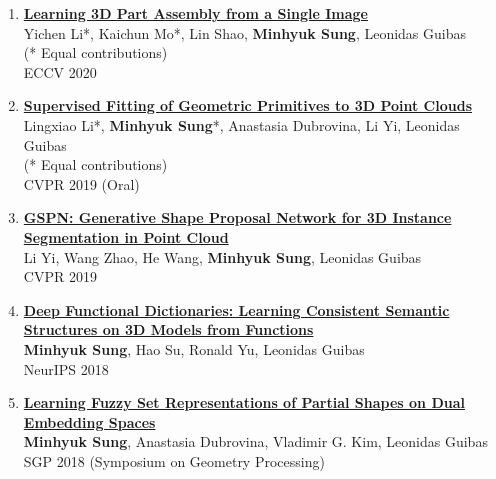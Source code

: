 \documentclass[letterpaper,10pt]{article} %
\newcommand{\blankline}{\quad\pagebreak[2]}
\begin{document}
{\begin{enumerate}
\item \label{eccv20_1}
\href{https://cs.stanford.edu/~kaichun/impartass/}{\textbf{Learning 3D Part Assembly from a Single Image}}\\
Yichen Li*, Kaichun Mo*, Lin Shao, \textbf{Minhyuk Sung}, Leonidas Guibas\\
(* Equal contributions)\\
ECCV 2020\\
\blankline

\item \label{cvpr19_2}
\href{https://arxiv.org/abs/1811.08988}{\textbf{Supervised Fitting of Geometric Primitives to 3D Point Clouds}}\\
Lingxiao Li*, \textbf{Minhyuk Sung}*, Anastasia Dubrovina, Li Yi, Leonidas Guibas\\
(* Equal contributions)\\
CVPR 2019 (Oral)\\
\blankline

\item \label{cvpr19_1}
\href{https://arxiv.org/abs/1812.03320}{\textbf{GSPN: Generative Shape Proposal Network for 3D Instance Segmentation in Point Cloud}}\\
Li Yi, Wang Zhao, He Wang, \textbf{Minhyuk Sung}, Leonidas Guibas\\
CVPR 2019\\
\blankline

\item \label{neurips18}
\href{https://arxiv.org/abs/1805.09957}{\textbf{Deep Functional Dictionaries: Learning Consistent Semantic Structures on 3D Models from Functions}}\\
\textbf{Minhyuk Sung}, Hao Su, Ronald Yu, Leonidas Guibas\\
NeurIPS 2018\\
\blankline

\item \label{sgp18}
\href{https://mhsung.github.io/fuzzy-set-dual}{\textbf{Learning Fuzzy Set Representations of Partial Shapes on Dual Embedding Spaces}}\\
\textbf{Minhyuk Sung}, Anastasia Dubrovina, Vladimir G. Kim, Leonidas Guibas\\
SGP 2018 (Symposium on Geometry Processing)\\
\blankline


\end{enumerate}}
\end{document}

